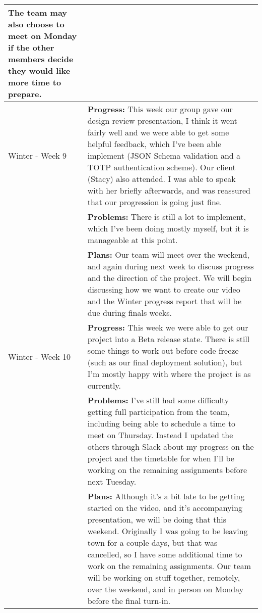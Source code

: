 \begin{longtable}[ht]{| p{1.5cm} | p{13.5cm} |}
     The team may also choose to meet on Monday if the other members decide they would like more time to prepare.
     \\
     \hline
     Winter - Week 9 &
     \textbf{Progress:} This week our group gave our design review presentation, I think it went fairly well and we were able to get some helpful feedback, which I've been able implement (JSON Schema validation and a TOTP authentication scheme).
     Our client (Stacy) also attended.
     I was able to speak with her briefly afterwards, and was reassured that our progression is going just fine.
     \\ & \textbf{Problems:} There is still a lot to implement, which I've been doing mostly myself, but it is manageable at this point.
     \\ & \textbf{Plans:} Our team will meet over the weekend, and again during next week to discuss progress and the direction of the project.
     We will begin discussing how we want to create our video and the Winter progress report that will be due during finals weeks.
     \\
     \hline
     Winter - Week 10 &
     \textbf{Progress:} This week we were able to get our project into a Beta release state.
     There is still some things to work out before code freeze (such as our final deployment solution), but I'm mostly happy with where the project is as currently.
     \\ & \textbf{Problems:} I've still had some difficulty getting full participation from the team, including being able to schedule a time to meet on Thursday.
     Instead I updated the others through Slack about my progress on the project and the timetable for when I'll be working on the remaining assignments before next Tuesday.
     \\ & \textbf{Plans:} Although it's a bit late to be getting started on the video, and it's accompanying presentation, we will be doing that this weekend.
     Originally I was going to be leaving town for a couple days, but that was cancelled, so I have some additional time to work on the remaining assignments.
     Our team will be working on stuff together, remotely, over the weekend, and in person on Monday before the final turn-in.
     \\
     \hline
\end{longtable}